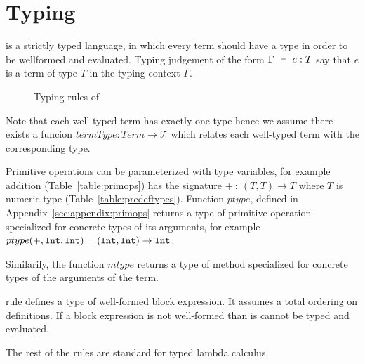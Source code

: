 \section{Typing}
\label{sec:typing}

\langname is a strictly typed language, in which every term should have a
type in order to be wellformed and evaluated. Typing judgement of the form
$\Gamma~\vdash~e : T$ say that $e$ is a term of type $T$ in the typing
context $\Gamma$.

\begin{figure}[h]

\caption{Typing rules of \langname}
\label{fig:typing}
\end{figure}

Note that each well-typed term has exactly one type hence we assume there
exists a funcion $termType: Term \to \mathcal{T}$ which relates each well-typed
term with the corresponding type.

Primitive operations can be parameterized with type variables, for example
addition (Table~\ref{table:primops}) has the signature $+~:~ (T,T) \to T$
where $T$ is numeric type (Table~\ref{table:predeftypes}). Function $ptype$, defined in Appendix~\ref{sec:appendix:primops} returns a type of primitive operation specialized for concrete types of its arguments, for example $ptype(+,\lst{Int}, \lst{Int}) = (\lst{Int}, \lst{Int}) \to \lst{Int}$.

Similarily, the function $mtype$ returns a type of method specialized for concrete types of the arguments of the  term.

 rule defines a type of well-formed block expression. It
assumes a total ordering on  definitions. If a block expression is
not well-formed than is cannot be typed and evaluated.

The rest of the rules are standard for typed lambda calculus.